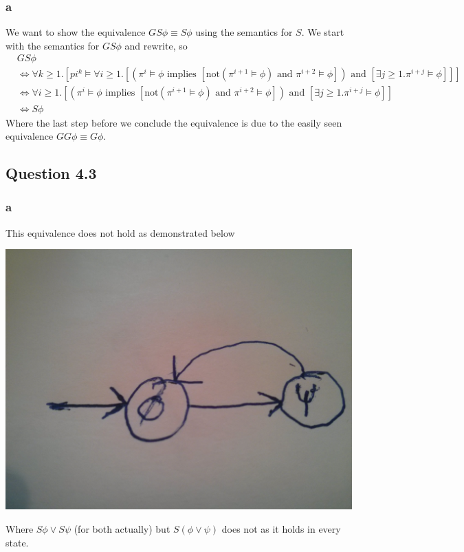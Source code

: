 \documentclass[12pt]{article}
\begin{document}
\subsubsection*{a}
We want to show the equivalence $GS\phi\equiv S\phi$ using the semantics for $S$. We start with the semantics for $GS\phi$ and rewrite, so
\begin{align*}
&GS\phi \\
&\Leftrightarrow \forall k\geq 1.[pi^k\models\forall i\geq 1.[(\pi^i\models\phi \mbox{ implies } [\mbox{not}(\pi^{i+1}\models \phi)\mbox{ and } \pi^{i+2}\models\phi]) \mbox{ and } [\exists j\geq 1.\pi^{i+j}\models \phi]]] \\
&\Leftrightarrow \forall i\geq 1.[(\pi^i\models\phi \mbox{ implies } [\mbox{not}(\pi^{i+1}\models \phi)\mbox{ and } \pi^{i+2}\models\phi]) \mbox{ and } [\exists j\geq 1.\pi^{i+j}\models \phi]] \\
&\Leftrightarrow S\phi
\end{align*}
Where the last step before we conclude the equivalence is due to the easily seen equivalence $GG\phi\equiv G\phi$.

\newpage
\subsection*{Question 4.3}
\subsubsection*{a}
This equivalence does not hold as demonstrated below
\begin{center}
\includegraphics[scale=0.1]{9}
\end{center}
Where $S\phi\lor S\psi$ (for both actually) but $S(\phi\lor\psi)$ does not as it holds in every state.
\end{document}
